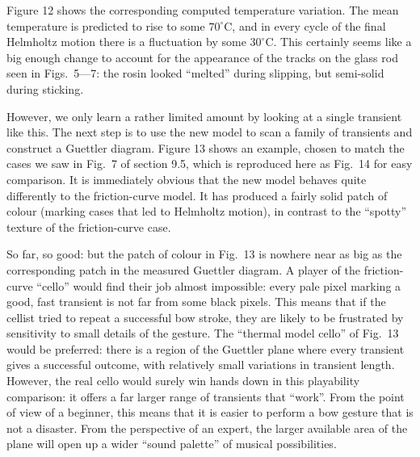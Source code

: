 
  Figure 12 shows the corresponding computed temperature variation. The mean 
  temperature is predicted to rise to some $70^\circ$C, and in every cycle of 
  the final Helmholtz motion there is a fluctuation by some $30^\circ$C. This 
  certainly seems like a big enough change to account for the appearance of the 
  tracks on the glass rod seen in Figs.\ 5—7: the rosin looked ``melted'' 
  during slipping, but semi-solid during sticking. 


  However, we only learn a rather limited amount by looking at a single 
  transient like this. The next step is to use the new model to scan a family 
  of transients and construct a Guettler diagram. Figure 13 shows an example, 
  chosen to match the cases we saw in Fig.\ 7 of section 9.5, which is 
  reproduced here as Fig.\ 14 for easy comparison. It is immediately obvious 
  that the new model behaves quite differently to the friction-curve model. It 
  has produced a fairly solid patch of colour (marking cases that led to 
  Helmholtz motion), in contrast to the “spotty” texture of the friction-curve 
  case. 


  So far, so good: but the patch of colour in Fig.\ 13 is nowhere near as big 
  as the corresponding patch in the measured Guettler diagram. A player of the 
  friction-curve “cello” would find their job almost impossible: every pale 
  pixel marking a good, fast transient is not far from some black pixels. This 
  means that if the cellist tried to repeat a successful bow stroke, they are 
  likely to be frustrated by sensitivity to small details of the gesture. The 
  “thermal model cello” of Fig.\ 13 would be preferred: there is a region of 
  the Guettler plane where every transient gives a successful outcome, with 
  relatively small variations in transient length. However, the real cello 
  would surely win hands down in this playability comparison: it offers a far 
  larger range of transients that “work”. From the point of view of a beginner, 
  this means that it is easier to perform a bow gesture that is not a disaster. 
  From the perspective of an expert, the larger available area of the plane 
  will open up a wider “sound palette” of musical possibilities. 

